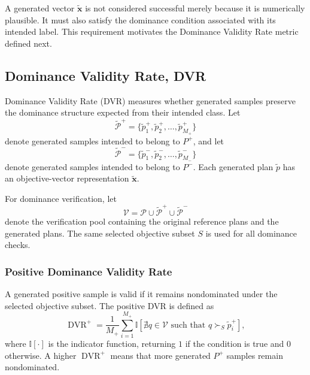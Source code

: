 A generated vector $\tilde{\mathbf{x}}$ is not considered successful merely because it is numerically plausible. It must also satisfy the dominance condition associated with its intended label. This requirement motivates the Dominance Validity Rate metric defined next.

\subsection{Dominance Validity Rate, DVR}
\label{subsec:dvr}

Dominance Validity Rate (DVR) measures whether generated samples preserve the dominance structure expected from their intended class. Let
\begin{equation}
    \tilde{\mathcal{P}}^{+}
    =
    \{\tilde{p}^{+}_1, \tilde{p}^{+}_2, \ldots, \tilde{p}^{+}_{M_{+}}\}
    \label{eq:generated_positive_set}
\end{equation}
denote generated samples intended to belong to $P^{+}$, and let
\begin{equation}
    \tilde{\mathcal{P}}^{-}
    =
    \{\tilde{p}^{-}_1, \tilde{p}^{-}_2, \ldots, \tilde{p}^{-}_{M_{-}}\}
    \label{eq:generated_negative_set}
\end{equation}
denote generated samples intended to belong to $P^{-}$. Each generated plan $\tilde{p}$ has an objective-vector representation $\tilde{\mathbf{x}}$.

For dominance verification, let
\begin{equation}
    \mathcal{V}
    =
    \mathcal{P}
    \cup
    \tilde{\mathcal{P}}^{+}
    \cup
    \tilde{\mathcal{P}}^{-}
    \label{eq:verification_pool}
\end{equation}
denote the verification pool containing the original reference plans and the generated plans. The same selected objective subset $S$ is used for all dominance checks.

\subsubsection{Positive Dominance Validity Rate}
\label{subsubsec:positive_dvr}

A generated positive sample is valid if it remains nondominated under the selected objective subset. The positive DVR is defined as
\begin{equation}
    \operatorname{DVR}^{+}
    =
    \frac{1}{M_{+}}
    \sum_{i=1}^{M_{+}}
    \mathbb{I}
    \left[
    \nexists q \in \mathcal{V}
    \text{ such that }
    q \succ_S \tilde{p}^{+}_i
    \right],
    \label{eq:positive_dvr}
\end{equation}
where $\mathbb{I}[\cdot]$ is the indicator function, returning $1$ if the condition is true and $0$ otherwise. A higher $\operatorname{DVR}^{+}$ means that more generated $P^{+}$ samples remain nondominated.

